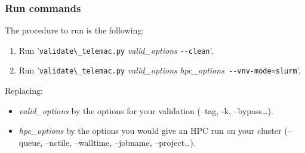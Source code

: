 \subsubsection{Run commands}

The procedure to run is the following:
\begin{enumerate}
  \item Run '\verb!validate\_telemac.py! \textit{valid\_options} \verb!--clean!'.
  \item Run '\verb!validate\_telemac.py! \textit{valid\_options}
    \textit{hpc\_options}\verb! --vnv-mode=slurm!'.
\end{enumerate}

Replacing:
\begin{itemize}
  \item \textit{valid\_options} by the options for your validation (--tag, -k,
    --bypass\ldots).
  \item \textit{hpc\_options} by the options you would give an HPC \telma{} run
    on your cluster (--queue, --nctile, --walltime, --jobname,
    --project\ldots).
\end{itemize}
